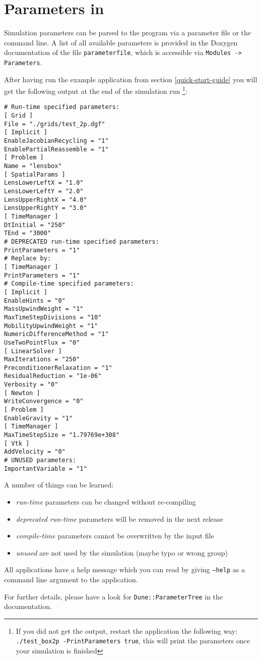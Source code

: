 \section{Parameters in \Dumux}
\label{sc_parameterfiles}
Simulation parameters can be parsed to the program via a parameter file or the command line.
A list of all available parameters is provided in the Doxygen documentation
of the file \texttt{parameterfile}, which is accessible via \texttt{Modules -> Parameters}.

After having run the example application from section \ref{quick-start-guide} you will
get the following output at the end of the simulation run
\footnote{If you did not get the output, restart the application the following way:
\texttt{./test{\_}box2p -PrintParameters true},
this will print the parameters once your simulation is finished}:
\begin{lstlisting}[style=Bash]
# Run-time specified parameters:
[ Grid ]
File = "./grids/test_2p.dgf"
[ Implicit ]
EnableJacobianRecycling = "1"
EnablePartialReassemble = "1"
[ Problem ]
Name = "lensbox"
[ SpatialParams ]
LensLowerLeftX = "1.0"
LensLowerLeftY = "2.0"
LensUpperRightX = "4.0"
LensUpperRightY = "3.0"
[ TimeManager ]
DtInitial = "250"
TEnd = "3000"
# DEPRECATED run-time specified parameters:
PrintParameters = "1"
# Replace by:
[ TimeManager ]
PrintParameters = "1"
# Compile-time specified parameters:
[ Implicit ]
EnableHints = "0"
MassUpwindWeight = "1"
MaxTimeStepDivisions = "10"
MobilityUpwindWeight = "1"
NumericDifferenceMethod = "1"
UseTwoPointFlux = "0"
[ LinearSolver ]
MaxIterations = "250"
PreconditionerRelaxation = "1"
ResidualReduction = "1e-06"
Verbosity = "0"
[ Newton ]
WriteConvergence = "0"
[ Problem ]
EnableGravity = "1"
[ TimeManager ]
MaxTimeStepSize = "1.79769e+308"
[ Vtk ]
AddVelocity = "0"
# UNUSED parameters:
ImportantVariable = "1"
\end{lstlisting}

A number of things can be learned:
\begin{itemize}
  \item \emph{run-time} parameters can be changed without re-compiling
  \item \emph{deprecated run-time} parameters will be removed in the next release
  \item \emph{compile-time} parameters cannot be overwritten by the input file
  \item \emph{unused} are not used by the simulation (maybe typo or wrong group)
\end{itemize}

All applications have a help message which you can read by giving
\texttt{--help} as a command line argument to the application.

For further details, please have a look for \texttt{Dune::ParameterTree}
in the \Dune documentation.
